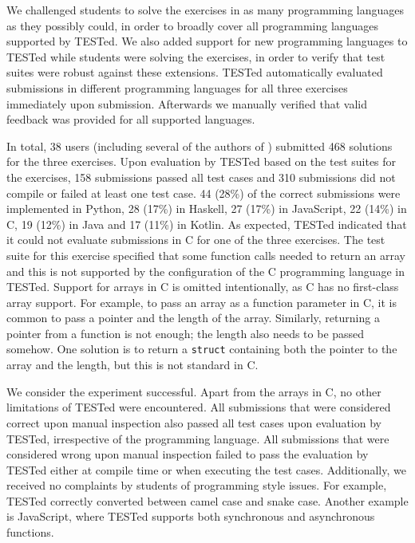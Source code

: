\documentclass[../main]{subfiles}
\begin{document}
We challenged students to solve the exercises in as many programming languages as they possibly could, in order to broadly cover all programming languages supported by TESTed.
We also added support for new programming languages to TESTed while students were solving the exercises, in order to verify that test suites were robust against these extensions.
TESTed automatically evaluated submissions in different programming languages for all three exercises immediately upon submission.
Afterwards we manually verified that valid feedback was provided for all supported languages.

In total, 38 users (including several of the authors of \textcite{strijbolTESTedEducationalTesting2023}) submitted 468 solutions for the three exercises.
Upon evaluation by TESTed based on the test suites for the exercises, 158 submissions passed all test cases and 310 submissions did not compile or failed at least one test case.
44 (28\%) of the correct submissions were implemented in Python, 28 (17\%) in Haskell, 27 (17\%) in JavaScript, 22 (14\%) in C, 19 (12\%) in Java and 17 (11\%) in Kotlin.
As expected, TESTed indicated that it could not evaluate submissions in C for one of the three exercises.
The test suite for this exercise specified that some function calls needed to return an array and this is not supported by the configuration of the C programming language in TESTed.
Support for arrays in C is omitted intentionally, as C has no first-class array support.
For example, to pass an array as a function parameter in C, it is common to pass a pointer and the length of the array.
Similarly, returning a pointer from a function is not enough;
the length also needs to be passed somehow.
One solution is to return a \texttt{struct} containing both the pointer to the array and the length, but this is not standard in C\@.

We consider the experiment successful.
Apart from the arrays in C, no other limitations of TESTed were encountered.
All submissions that were considered correct upon manual inspection also passed all test cases upon evaluation by TESTed, irrespective of the programming language.
All submissions that were considered wrong upon manual inspection failed to pass the evaluation by TESTed either at compile time or when executing the test cases.
Additionally, we received no complaints by students of programming style issues.
For example, TESTed correctly converted between camel case and snake case.
Another example is JavaScript, where TESTed supports both synchronous and asynchronous functions.
\end{document}
